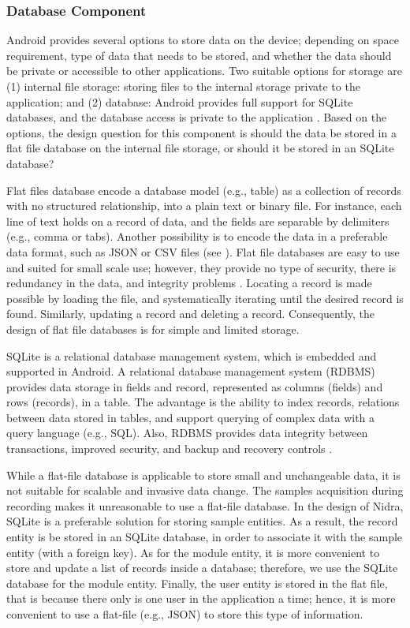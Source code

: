 \subsubsection{Database Component}\label{des:dc}

\noindent Android provides several options to store data on the device; depending on space requirement, type of data that needs to be stored, and whether the data should be private or accessible to other applications. Two suitable options for storage are (1) internal file storage: storing files to the internal storage private to the application; and (2) database: Android provides full support for SQLite databases, and the database access is private to the application \cite{android_storage}. Based on the options, the design question for this component is should the data be stored in a flat file database on the internal file storage, or should it be stored in an SQLite database?

Flat files database encode a database model (e.g., table) as a collection of records with no structured relationship, into a plain text or binary file. For instance, each line of text holds on a record of data, and the fields are separable by delimiters (e.g., comma or tabs). Another possibility is to encode the data in a preferable data format, such as JSON or CSV files (see ). Flat file databases are easy to use and suited for small scale use; however, they provide no type of security, there is redundancy in the data, and integrity problems \cite{flatfilerdbms}. Locating a record is made possible by loading the file, and systematically iterating until the desired record is found. Similarly, updating a record and deleting a record. Consequently, the design of flat file databases is for simple and limited storage.

SQLite is a relational database management system, which is embedded and supported in Android. A relational database management system (RDBMS) provides data storage in fields and record, represented as columns (fields) and rows (records), in a table. The advantage is the ability to index records, relations between data stored in tables, and support querying of complex data with a query language (e.g., SQL). Also, RDBMS provides data integrity between transactions, improved security, and backup and recovery controls \cite{flatfilerdbms}. 

While a flat-file database is applicable to store small and unchangeable data, it is not suitable for scalable and invasive data change. The samples acquisition during recording makes it unreasonable to use a flat-file database. In the design of Nidra, SQLite is a preferable solution for storing sample entities. As a result, the record entity is be stored in an SQLite database, in order to associate it with the sample entity (with a foreign key). As for the module entity, it is more convenient to store and update a list of records inside a database; therefore, we use the SQLite database for the module entity. Finally, the user entity is stored in the flat file, that is because there only is one user in the application a time; hence, it is more convenient to use a flat-file (e.g., JSON) to store this type of information.

